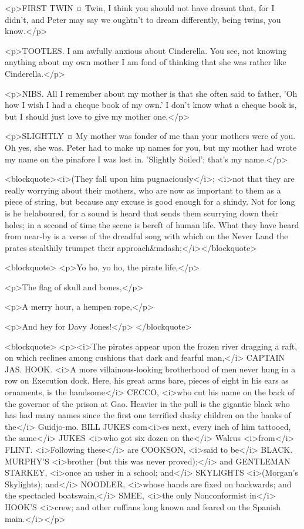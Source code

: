 <p>FIRST TWIN ¤
Twin, I think you should not have dreamt that, for I didn't, and Peter may say we oughtn't to dream differently, being twins, you know.</p>

<p>TOOTLES. I am awfully anxious about Cinderella. You see, not knowing anything about my own mother I am fond of thinking that she was rather like Cinderella.</p>


<p>NIBS. All I remember about my mother is that she often said to father, 'Oh how I wish I had a cheque book of my own.' I don't know what a cheque book is, but I should just love to give my mother one.</p>

<p>SLIGHTLY ¤
My mother was fonder of me than your mothers were of you.
Oh yes, she was. Peter had to make up names for you, but my mother had wrote my name on the pinafore I was lost in. 'Slightly Soiled'; that's my name.</p>

<blockquote><i>(They fall upon him pugnaciously</i>; <i>not that they are really worrying about their mothers, who are now as important to them as a piece of string, but because any excuse is good enough for a shindy. Not for long is he belaboured, for a sound is heard that sends them scurrying down their holes; in a second of time the scene is bereft of human life. What they have heard from near-by is a verse of the dreadful song with which on the Never Land the prates stealthily trumpet their approach&mdash;</i></blockquote>

<blockquote> <p>Yo ho, yo ho, the pirate life,</p>

<p>The flag of skull and bones,</p>

<p>A merry hour, a hempen rope,</p>

<p>And hey for Davy Jones!</p> </blockquote>

<blockquote> <p><i>The pirates appear upon the frozen river dragging a raft, on which reclines among cushions that dark and fearful man,</i> CAPTAIN JAS. HOOK. <i>A more villainous-looking brotherhood of men never hung in a row on Execution dock. Here, his great arms bare, pieces of eight in his ears as ornaments, is the handsome</i> CECCO, <i>who cut his name on the back of the governor of the prison at Gao. Heavier in the pull is the gigantic black who has had many names since the first one terrified dusky children on the banks of the</i> Guidjo-mo. BILL JUKES com<i>es next, every inch of him tattooed, the same</i> JUKES <i>who got six dozen on the</i> Walrus <i>from</i> FLINT. <i>Following these</i> are COOKSON, <i>said to be</i> BLACK. MURPHY'S <i>brother (but this was never proved);</i> and GENTLEMAN STARKEY, <i>once an usher in a school; and</i> SKYLIGHTS <i>(Morgan's Skylights); and</i> NOODLER, <i>whose hands are fixed on backwards; and the spectacled boatswain,</i> SMEE, <i>the only Nonconformist in</i> HOOK'S <i>crew; and other ruffians long known and feared on the Spanish main.</i></p>

